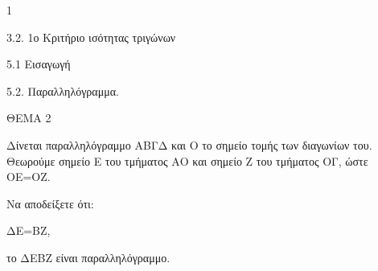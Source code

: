 \begin{ylh}{1}
    \item 3.2. 1ο Κριτήριο ισότητας τριγώνων
    \item 5.1 Εισαγωγή
    \item 5.2. Παραλληλόγραμμα.
\end{ylh}

ΘΕΜΑ 2

Δίνεται παραλληλόγραμμο ΑΒΓΔ και Ο το σημείο τομής των διαγωνίων του. Θεωρούμε σημείο Ε του τμήματος ΑΟ και σημείο Ζ του τμήματος ΟΓ, ώστε ΟΕ=ΟΖ.

Να αποδείξετε ότι:

\begin{alist}
\item ΔΕ=ΒΖ, 

\item το ΔΕΒΖ είναι παραλληλόγραμμο. 
\end{alist}
